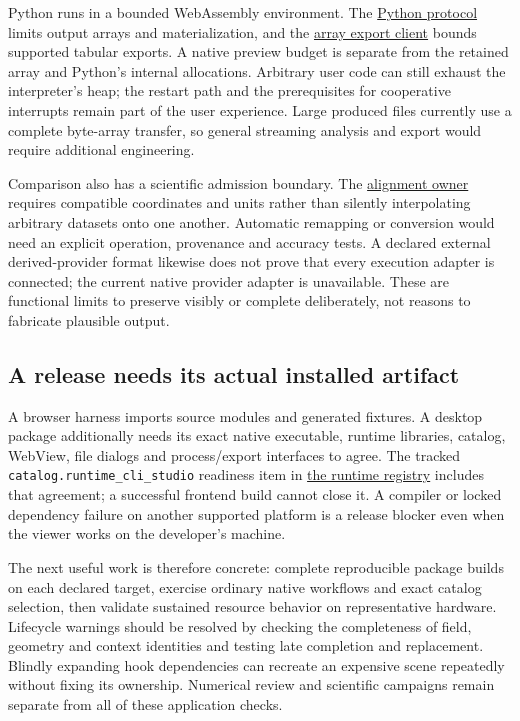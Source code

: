 Python runs in a bounded WebAssembly environment. The
\href{../ui/src/lib/platform/pyodideProtocol.ts}{Python protocol} limits output
arrays and materialization, and the
\href{../ui/src/lib/platform/pythonArrayExportClient.ts}{array export client}
bounds supported tabular exports. A native preview budget is separate from
the retained array and Python's internal allocations. Arbitrary user code can
still exhaust the interpreter's heap; the restart path and the prerequisites
for cooperative interrupts remain part of the user experience. Large produced
files currently use a complete byte-array transfer, so general streaming
analysis and export would require additional engineering.

Comparison also has a scientific admission boundary. The
\href{../ui/src/lib/dataset/datasetAlignment.ts}{alignment owner} requires
compatible coordinates and units rather than silently interpolating arbitrary
datasets onto one another. Automatic remapping or conversion would need an
explicit operation, provenance and accuracy tests. A declared external
derived-provider format likewise does not prove that every execution adapter
is connected; the current native provider adapter is unavailable. These are
functional limits to preserve visibly or complete deliberately, not reasons
to fabricate plausible output.

\subsection{A release needs its actual installed artifact}

A browser harness imports source modules and generated fixtures. A desktop
package additionally needs its exact native executable, runtime libraries,
catalog, WebView, file dialogs and process/export interfaces to agree. The
tracked \texttt{catalog.runtime\_cli\_studio} readiness item in
\href{../src/core/runtime/readiness.cpp}{the runtime registry} includes that
agreement; a successful frontend build cannot close it. A compiler or locked
dependency failure on another supported platform is a release blocker even
when the viewer works on the developer's machine.

The next useful work is therefore concrete: complete reproducible package
builds on each declared target, exercise ordinary native workflows and exact
catalog selection, then validate sustained resource behavior on representative
hardware. Lifecycle warnings should be resolved by checking the completeness
of field, geometry and context identities and testing late completion and
replacement. Blindly expanding hook dependencies can recreate an expensive
scene repeatedly without fixing its ownership. Numerical review and scientific
campaigns remain separate from all of these application checks.

